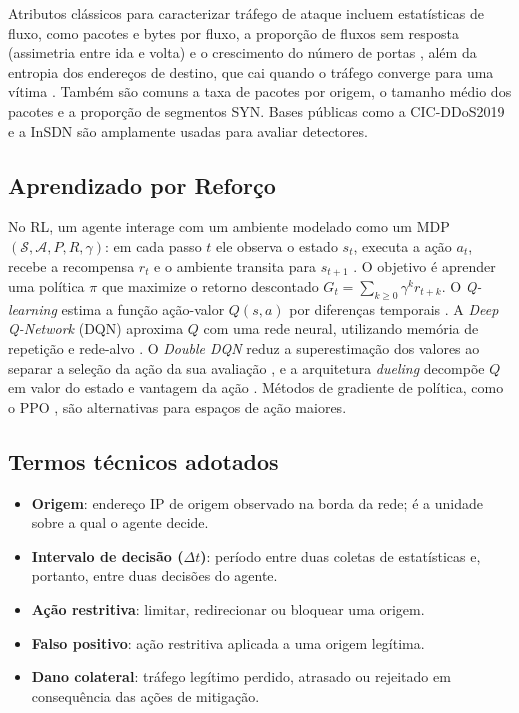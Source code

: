 \documentclass[12pt]{article}
\begin{document}
Atributos clássicos para caracterizar tráfego de ataque incluem estatísticas
de fluxo, como pacotes e bytes por fluxo, a proporção de fluxos sem resposta
(assimetria entre ida e volta) e o crescimento do número de portas
\cite{braga2010lightweight}, além da entropia dos endereços de destino, que cai
quando o tráfego converge para uma vítima \cite{mousavi2015entropy}. Também são
comuns a taxa de pacotes por origem, o tamanho médio dos pacotes e a proporção
de segmentos SYN. Bases públicas como a
CIC-DDoS2019 \cite{sharafaldin2019cicddos} e a InSDN \cite{elsayed2020insdn}
são amplamente usadas para avaliar detectores.

\subsection{Aprendizado por Reforço}

No RL, um agente interage com um ambiente modelado como um MDP
$(\mathcal{S},\mathcal{A},P,R,\gamma)$: em cada passo $t$ ele observa o estado
$s_t$, executa a ação $a_t$, recebe a recompensa $r_t$ e o ambiente transita
para $s_{t+1}$ \cite{sutton2018rl}. O objetivo é aprender uma política $\pi$ que
maximize o retorno descontado $G_t=\sum_{k\ge 0}\gamma^k r_{t+k}$. O
\textit{Q-learning} estima a função ação-valor $Q(s,a)$ por diferenças
temporais \cite{watkins1992qlearning}. A \textit{Deep Q-Network} (DQN) aproxima
$Q$ com uma rede neural, utilizando memória de repetição e rede-alvo
\cite{mnih2015dqn}. O \textit{Double DQN} reduz a superestimação dos valores ao
separar a seleção da ação da sua avaliação \cite{vanhasselt2016ddqn}, e a
arquitetura \textit{dueling} decompõe $Q$ em valor do estado e vantagem da ação
\cite{wang2016dueling}. Métodos de gradiente de política, como o PPO
\cite{schulman2017ppo}, são alternativas para espaços de ação maiores.

\subsection{Termos técnicos adotados}

\begin{itemize}
  \item \textbf{Origem}: endereço IP de origem observado na borda da rede; é a
        unidade sobre a qual o agente decide.
  \item \textbf{Intervalo de decisão ($\Delta t$)}: período entre duas coletas
        de estatísticas e, portanto, entre duas decisões do agente.
  \item \textbf{Ação restritiva}: limitar, redirecionar ou bloquear uma origem.
  \item \textbf{Falso positivo}: ação restritiva aplicada a uma origem
        legítima.
  \item \textbf{Dano colateral}: tráfego legítimo perdido, atrasado ou
        rejeitado em consequência das ações de mitigação.
\end{itemize}
\end{document}
